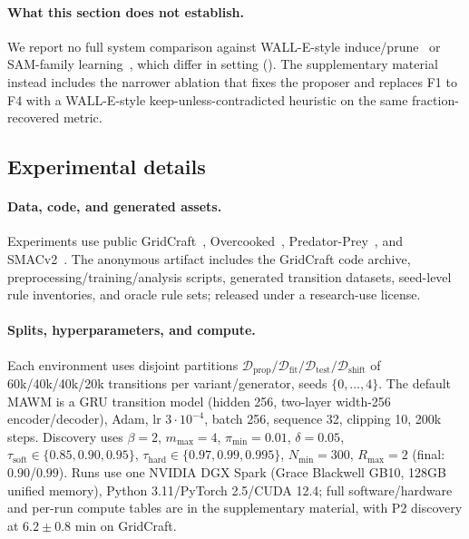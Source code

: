 \documentclass[letterpaper]{article} %
\let\autoref\Cref
\theoremstyle{plain}
\theoremstyle{definition}
\theoremstyle{remark}
\begin{document}
\paragraph{What this section does not establish.} We report no full system comparison against WALL-E-style induce/prune~\cite{zhou2024walle,zhou2025walle2} or SAM-family learning~\cite{lehiu2024safeactionmodelspo,mordoch2024conditionalsam}, which differ in setting (\autoref{sec:related}). The supplementary material instead includes the narrower ablation that fixes the proposer and replaces F1 to F4 with a WALL-E-style keep-unless-contradicted heuristic on the same fraction-recovered metric.

\subsection{Experimental details}
\label{sec:exp-details}

\paragraph{Data, code, and generated assets.} Experiments use public GridCraft~\cite{gridcraft2026anonymous}, Overcooked~\cite{Micah2020overcooked}, Predator-Prey~\cite{lowe2017multi}, and SMACv2~\cite{Ellis2023smacv2}. The anonymous artifact includes the GridCraft code archive, preprocessing/training/analysis scripts, generated transition datasets, seed-level rule inventories, and oracle rule sets; released under a research-use license.

\paragraph{Splits, hyperparameters, and compute.} Each environment uses disjoint partitions $\mathcal{D}_{\mathrm{prop}}/\mathcal{D}_{\mathrm{fit}}/\mathcal{D}_{\mathrm{test}}/\mathcal{D}_{\mathrm{shift}}$ of 60k/40k/40k/20k transitions per variant/generator, seeds $\{0,\dots,4\}$. The default MAWM is a GRU transition model (hidden 256, two-layer width-256 encoder/decoder), Adam, lr $3\cdot10^{-4}$, batch 256, sequence 32, clipping 10, 200k steps. Discovery uses $\beta=2$, $m_{\max}=4$, $\pi_{\min}=0.01$, $\delta=0.05$, $\tau_{\mathrm{soft}}\in\{0.85,0.90,0.95\}$, $\tau_{\mathrm{hard}}\in\{0.97,0.99,0.995\}$, $N_{\min}=300$, $R_{\max}=2$ (final: $0.90$/$0.99$). Runs use one NVIDIA DGX Spark (Grace Blackwell GB10, 128GB unified memory), Python 3.11/PyTorch 2.5/CUDA 12.4; full software/hardware and per-run compute tables are in the supplementary material, with P2 discovery at $6.2\pm0.8$ min on GridCraft.
\end{document}

